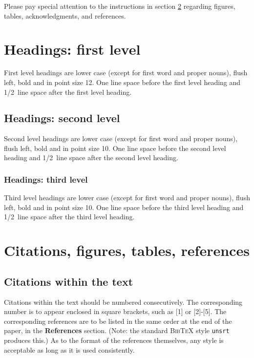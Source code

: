 \documentclass{article} %
\begin{document}
Please pay special attention to the instructions in section \ref{others}
regarding figures, tables, acknowledgments, and references.

\section{Headings: first level}
\label{headings}

First level headings are lower case (except for first word and proper nouns),
flush left, bold and in point size 12. One line space before the first level
heading and 1/2~line space after the first level heading.

\subsection{Headings: second level}

Second level headings are lower case (except for first word and proper nouns),
flush left, bold and in point size 10. One line space before the second level
heading and 1/2~line space after the second level heading.

\subsubsection{Headings: third level}

Third level headings are lower case (except for first word and proper nouns),
flush left, bold and in point size 10. One line space before the third level
heading and 1/2~line space after the third level heading.

\section{Citations, figures, tables, references}
\label{others}


\subsection{Citations within the text}

Citations within the text should be numbered consecutively. The corresponding
number is to appear enclosed in square brackets, such as [1] or [2]-[5]. The
corresponding references are to be listed in the same order at the end of the
paper, in the \textbf{References} section. (Note: the standard
\textsc{Bib\TeX} style \texttt{unsrt} produces this.) As to the format of the
references themselves, any style is acceptable as long as it is used
consistently.
\end{document}
